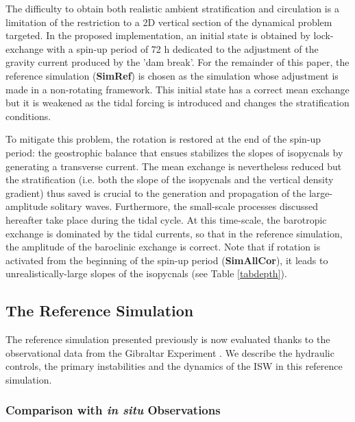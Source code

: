 The difficulty to obtain both realistic ambient stratification and circulation is a limitation of the restriction to a 2D vertical section of the dynamical problem targeted. In the proposed implementation, an initial state is obtained by lock-exchange with a spin-up period of 72 h dedicated to the adjustment of the gravity current produced by the 'dam break'. For the remainder of this paper, the reference simulation (\textbf{SimRef}) is chosen as the simulation whose adjustment is made in a non-rotating framework. This initial state has a correct mean exchange but it is weakened as the tidal forcing is introduced and changes the stratification conditions.

To mitigate this problem, the rotation is restored at the end of the spin-up period: the geostrophic balance that ensues stabilizes the slopes of isopycnals by generating a transverse current. The mean exchange is nevertheless reduced but the stratification (i.e. both the slope of the isopycnals and the vertical density gradient) thus saved is crucial to the generation and propagation of the large-amplitude solitary waves. Furthermore, the small-scale processes discussed hereafter take place during the tidal cycle. At this time-scale, the barotropic exchange is dominated by the tidal currents, so that in the reference simulation, the amplitude of the baroclinic exchange is correct. Note that if rotation is activated from the beginning of the spin-up period (\textbf{SimAllCor}), it leads to unrealistically-large slopes of the isopycnals (see Table \ref{tabdepth}). 


\subsection{The Reference Simulation}
\label{sRef}

\indent The reference simulation presented previously is now evaluated thanks to the observational data from the Gibraltar Experiment \citep{FA1988}. We describe the hydraulic controls, the primary instabilities and the dynamics of the ISW in this reference simulation.

\subsubsection{Comparison with \textit{in situ} Observations}
\label{refobs}


